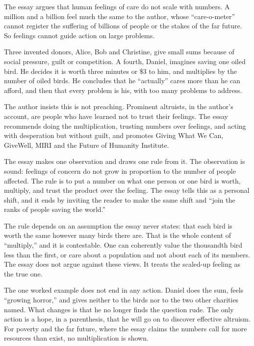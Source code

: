 \begin{afterword}
\summaryhead

The essay argues that human feelings of care do not scale with numbers. A million and a billion feel much the same to the author, whose ``care-o-meter'' cannot register the suffering of billions of people or the stakes of the far future. So feelings cannot guide action on large problems.

Three invented donors, Alice, Bob and Christine, give small sums because of social pressure, guilt or competition. A fourth, Daniel, imagines saving one oiled bird. He decides it is worth three minutes or \$3 to him, and multiplies by the number of oiled birds. He concludes that he ``actually'' cares more than he can afford, and then that every problem is his, with too many problems to address.

The author insists this is not preaching. Prominent altruists, in the author's account, are people who have learned not to trust their feelings. The essay recommends doing the multiplication, trusting numbers over feelings, and acting with desperation but without guilt, and promotes Giving What We Can, GiveWell, MIRI and the Future of Humanity Institute.

\responsehead

The essay makes one observation and draws one rule from it. The observation is sound: feelings of concern do not grow in proportion to the number of people affected. The rule is to put a number on what one person or one bird is worth, multiply, and trust the product over the feeling. The essay tells this as a personal shift, and it ends by inviting the reader to make the same shift and ``join the ranks of people saving the world.''

The rule depends on an assumption the essay never states: that each bird is worth the same however many birds there are. That is the whole content of ``multiply,'' and it is contestable. One can coherently value the thousandth bird less than the first, or care about a population and not about each of its members. The essay does not argue against these views. It treats the scaled-up feeling as the true one.

The one worked example does not end in any action. Daniel does the sum, feels ``growing horror,'' and gives neither to the birds nor to the two other charities named. What changes is that he no longer finds the question rude. The only action is a hope, in a parenthesis, that he will go on to discover effective altruism. For poverty and the far future, where the essay claims the numbers call for more resources than exist, no multiplication is shown.


\end{afterword}
